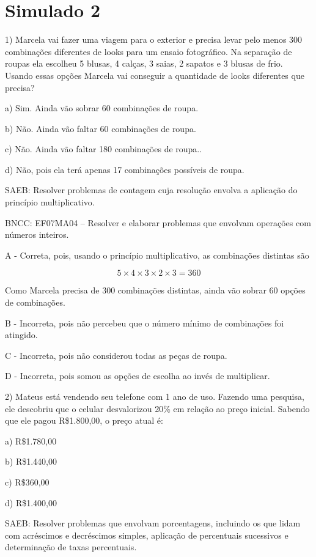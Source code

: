 \hypertarget{simulado-2}{%
\section{Simulado 2}\label{simulado-2}}

1) Marcela vai fazer uma viagem para o exterior e precisa levar pelo
menos 300 combinações diferentes de looks para um ensaio fotográfico. Na
separação de roupas ela escolheu 5 blusas, 4 calças, 3 saias, 2 sapatos
e 3 blusas de frio. Usando essas opções Marcela vai conseguir a
quantidade de looks diferentes que precisa?

a) Sim. Ainda vão sobrar 60 combinações de roupa.

b) Não. Ainda vão faltar 60 combinações de roupa.

c) Não. Ainda vão faltar 180 combinações de roupa..

d) Não, pois ela terá apenas 17 combinações possíveis de roupa.

SAEB: Resolver problemas de contagem cuja resolução envolva a aplicação
do princípio multiplicativo.

BNCC: EF07MA04 -- Resolver e elaborar problemas que envolvam operações
com números inteiros.

A - Correta, pois, usando o princípio multiplicativo, as combinações
distintas são

\[5 \times 4 \times 3 \times 2 \times 3 = 360\]

Como Marcela precisa de 300 combinações distintas, ainda vão sobrar 60
opções de combinações.

B - Incorreta, pois não percebeu que o número mínimo de combinações foi
atingido.

C - Incorreta, pois não considerou todas as peças de roupa.

D - Incorreta, pois somou as opções de escolha ao invés de multiplicar.

2) Mateus está vendendo seu telefone com 1 ano de uso. Fazendo uma
pesquisa, ele descobriu que o celular desvalorizou 20\% em relação ao
preço inicial. Sabendo que ele pagou R\$1.800,00, o preço atual é:

a) R\$1.780,00

b) R\$1.440,00

c) R\$360,00

d) R\$1.400,00

SAEB: Resolver problemas que envolvam porcentagens, incluindo os que
lidam com acréscimos e decréscimos simples, aplicação de percentuais
sucessivos e determinação de taxas percentuais.

